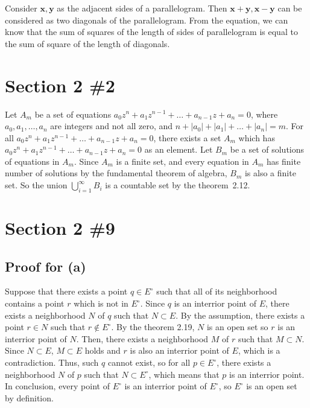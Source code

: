 \documentclass{scrartcl}
\begin{document}
Consider \(\mathbf{x}, \mathbf{y}\) as the adjacent sides of a parallelogram.
Then \(\mathbf{x + y}, \mathbf{x - y}\) can be considered as two diagonals of the parallelogram.
From the equation, we can know that the sum of squares of the length of sides of parallelogram is equal to the sum of square of the length of diagonals.

\section{Section 2 \#2}
Let \(A_m\) be a set of equations \(a_0 z^n + a_1 z^{n - 1} + \dots + a_{n - 1} z + a_n = 0\), where \(a_0, a_1, \dots, a_n\) are integers and not all zero, and \(n + |a_0| + |a_1| + \dots + |a_n| = m\).
For all \(a_0 z^n + a_1 z^{n - 1} + \dots + a_{n - 1} z + a_n = 0\), there exists a set \(A_m\) which has \(a_0 z^n + a_1 z^{n - 1} + \dots + a_{n - 1} z + a_n = 0\) as an element.
Let \(B_m\) be a set of solutions of equations in \(A_m\).
Since \(A_m\) is a finite set, and every equation in \(A_m\) has finite number of solutions by the fundamental theorem of algebra, \(B_m\) is also a finite set.
So the union \(\bigcup_{i = 1}^\infty B_i\) is a countable set by the theorem~2.12.

\section{Section 2 \#9}
\subsection{Proof for (a)}
Suppose that there exists a point \(q \in E^\circ\) such that all of its neighborhood contains a point \(r\) which is not in \(E^\circ\).
Since \(q\) is an interrior point of \(E\), there exists a neighborhood \(N\) of \(q\) such that \(N \subset E\).
By the assumption, there exists a point \(r \in N\) such that \(r \not \in E^\circ\).
By the theorem 2.19, \(N\) is an open set so \(r\) is an interrior point of \(N\).
Then, there exists a neighborhood \(M\) of \(r\) such that \(M \subset N\).
Since \(N \subset E\), \(M \subset E\) holds and \(r\) is also an interrior point of \(E\), which is a contradiction.
Thus, such \(q\) cannot exist, so for all \(p \in E^\circ\), there exists a neighborhood \(N\) of \(p\) such that \(N \subset E^\circ\), which means that \(p\) is an interrior point.
In conclusion, every point of \(E^\circ\) is an interrior point of \(E^\circ\), so \(E^\circ\) is an open set by definition.
\end{document}
